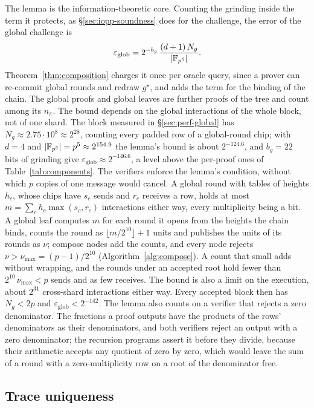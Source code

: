 The lemma is the information-theoretic core. Counting the grinding inside the term it protects, as \S\ref{sec:iopp-soundness} does for the \LogUp{} challenge, the error of the global challenge is
\[
  \varepsilon_{\mathrm{glob}} = 2^{-b_g}\, \frac{(d+1)\, N_g}{|\mathbb{F}_{p^5}|}.
\]
Theorem~\ref{thm:composition} charges it once per oracle query, since a prover can re-commit global rounds and redraw $g^\star$, and adds the term for the binding of the chain. The global proofs and global leaves are further proofs of the tree and count among its $n_\pi$. The bound depends on the global interactions of the whole block, not of one shard. The block measured in \S\ref{sec:perf-global} has $N_g \approx 2.75 \cdot 10^8 \approx 2^{28}$, counting every padded row of a global-round chip; with $d = 4$ and $|\mathbb{F}_{p^5}| = p^5 \approx 2^{154.9}$ the lemma's bound is about $2^{-124.6}$, and $b_g = 22$ bits of grinding give $\varepsilon_{\mathrm{glob}} \approx 2^{-146.6}$, a level above the per-proof ones of Table~\ref{tab:components}. The verifiers enforce the lemma's condition, without which $p$ copies of one message would cancel. A global round with tables of heights $h_c$, whose chips have $s_c$ sends and $r_c$ receives a row, holds at most $m = \sum_c h_c \max(s_c, r_c)$ interactions either way, every multiplicity being a bit. A global leaf computes $m$ for each round it opens from the heights the chain binds, counts the round as $\lfloor m / 2^{10} \rfloor + 1$ units and publishes the units of its rounds as $\nu$; compose nodes add the counts, and every node rejects $\nu > \nu_{\max} = (p-1)/2^{10}$ (Algorithm~\ref{alg:compose}). A count that small adds without wrapping, and the rounds under an accepted root hold fewer than $2^{10}\, \nu_{\max} < p$ sends and as few receives. The bound is also a limit on the execution, about $2^{31}$ cross-shard interactions either way. Every accepted block then has $N_g < 2p$ and $\varepsilon_{\mathrm{glob}} < 2^{-142}$. The lemma also counts on a verifier that rejects a zero denominator. The fractions a proof outputs have the products of the rows' denominators as their denominators, and both verifiers reject an output with a zero denominator; the recursion programs assert it before they divide, because their arithmetic accepts any quotient of zero by zero, which would leave the sum of a round with a zero-multiplicity row on a root of the denominator free.

\subsection{Trace uniqueness}
\label{sec:air-unique}

